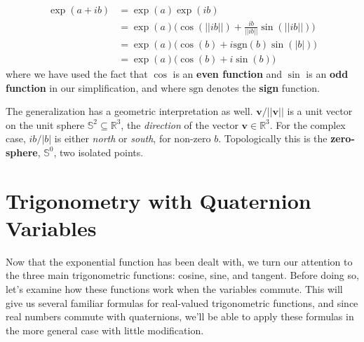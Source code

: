 \documentclass{article}
\theoremstyle{plain}
\theoremstyle{normal}
\begin{document}
            \begin{subequations}
                \label{eqn:exp_quaternion_purely_complex}
                \begin{align}
                    \exp(a+ib)
                    &=\exp(a)\exp(ib)\\
                    &=\exp(a)\Big(
                        \cos(||ib||)+\frac{ib}{||ib||}\sin(||ib||)
                    \Big)\\
                    &=\exp(a)\Big(\cos(b)+i\textrm{sgn}(b)\sin(|b|)\Big)\\
                    &=\exp(a)\Big(\cos(b)+i\sin(b)\Big)
                \end{align}
            \end{subequations}
            where we have used the fact that $\cos$ is an \textbf{even function}
            and $\sin$ is an \textbf{odd function} in our simplification, and
            where $\textrm{sgn}$ denotes the \textbf{sign} function.
            \par\hfill\par
            The generalization has a geometric interpretation as well.
            $\mathbf{v}/||\mathbf{v}||$ is a unit vector on the unit sphere
            $\mathbb{S}^{2}\subseteq\mathbb{R}^{3}$, the \textit{direction} of
            the vector $\mathbf{v}\in\mathbb{R}^{3}$. For the complex case,
            $ib/|b|$ is either \textit{north} or \textit{south}, for non-zero
            $b$. Topologically this is the \textbf{zero-sphere},
            $\mathbb{S}^{0}$, two isolated points.
    \section{Trigonometry with Quaternion Variables}
        Now that the exponential function has been dealt with, we turn our
        attention to the three main trigonometric functions: cosine, sine, and
        tangent. Before doing so, let's examine how these functions work when
        the variables commute. This will give us several familiar formulas for
        real-valued trigonometric functions, and since real numbers commute
        with quaternions, we'll be able to apply these formulas in the more
        general case with little modification.
\end{document}
